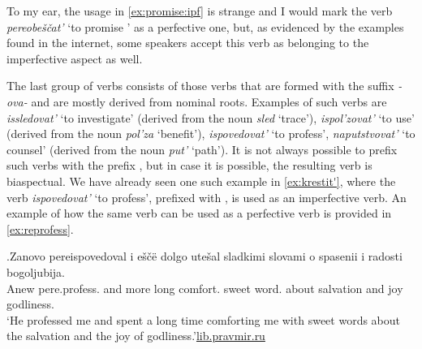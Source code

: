 To my ear, the usage in \ref{ex:promise:ipf} is strange and I would mark the verb \textit{pereobe\v{s}\v{c}at'} `to promise ' as a perfective one, but, as evidenced by the examples found in the internet, some speakers accept this verb as belonging to the imperfective aspect as well.

The last group of verbs consists of those verbs that are formed with the suffix \textit{-ova-} and are mostly derived from nominal roots. Examples of such verbs are \textit{issledovat'} `to investigate' (derived from the noun \textit{sled} `trace'), \textit{ispol'zovat'} `to use' (derived from the noun \textit{pol'za} `benefit'), \textit{ispovedovat'} `to profess', \textit{naputstvovat'} `to counsel' (derived from the noun \textit{put'} `path'). It is not always possible to prefix such verbs with the  prefix , but in case it is possible, the resulting verb is biaspectual. We have already seen one such example in \ref{ex:krestit'}, where the verb \textit{ispovedovat'} `to profess', prefixed with , is used as an imperfective verb. An example of how the same verb can be used as a perfective verb is provided in \ref{ex:reprofess}.

\exg.\label{ex:reprofess}Zanovo pereispovedoval i e\v{s}\v{c}\"{e} dolgo ute\v{s}al sladkimi slovami o spasenii i radosti bogoljubija.\\
Anew pere.profess. and more long comfort. sweet word. about salvation and joy godliness.\\
\trans `He professed me  and spent a long time comforting me with sweet words about the salvation and the joy of godliness.'\hbox{}\hfill\hbox{\url{lib.pravmir.ru}}


